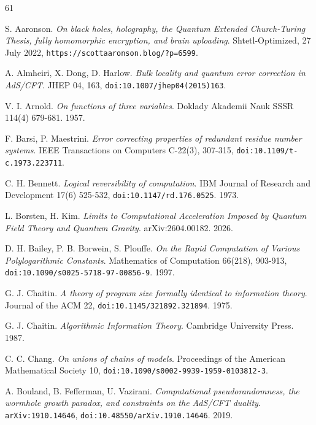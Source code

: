 \backmatter
{}
\begin{thebibliography}{61}

S. Aaronson. \emph{On black holes, holography, the Quantum Extended Church-Turing Thesis, fully homomorphic encryption, and brain uploading}. Shtetl-Optimized, 27 July 2022, \texttt{https:/\allowbreak{}/\allowbreak{}scottaaronson.blog/\allowbreak{}?p=6599}.

A. Almheiri, X. Dong, D. Harlow. \emph{Bulk locality and quantum error correction in AdS/CFT}. JHEP 04, 163, \texttt{doi:10.1007/\allowbreak{}jhep04(2015)163}.

V. I. Arnold. \emph{On functions of three variables}. Doklady Akademii Nauk SSSR 114(4) 679-681. 1957.

F. Barsi, P. Maestrini. \emph{Error correcting properties of redundant residue number systems}. IEEE Transactions on Computers C-22(3), 307-315, \texttt{doi:10.1109/\allowbreak{}t-c.1973.223711}.

C. H. Bennett. \emph{Logical reversibility of computation}. IBM Journal of Research and Development 17(6) 525-532, \texttt{doi:10.1147/\allowbreak{}rd.176.0525}. 1973.

L. Borsten, H. Kim. \emph{Limits to Computational Acceleration Imposed by Quantum Field Theory and Quantum Gravity}. arXiv:2604.00182. 2026.

D. H. Bailey, P. B. Borwein, S. Plouffe. \emph{On the Rapid Computation of Various Polylogarithmic Constants}. Mathematics of Computation 66(218), 903-913, \texttt{doi:10.1090/\allowbreak{}s0025-5718-97-00856-9}. 1997.

G. J. Chaitin. \emph{A theory of program size formally identical to information theory}. Journal of the ACM 22, \texttt{doi:10.1145/\allowbreak{}321892.321894}. 1975.

G. J. Chaitin. \emph{Algorithmic Information Theory}. Cambridge University Press. 1987.

C. C. Chang. \emph{On unions of chains of models}. Proceedings of the American Mathematical Society 10, \texttt{doi:10.1090/\allowbreak{}s0002-9939-1959-0103812-3}.

A. Bouland, B. Fefferman, U. Vazirani. \emph{Computational pseudorandomness, the wormhole growth paradox, and constraints on the AdS/CFT duality}. \texttt{arXiv:1910.14646}, \texttt{doi:10.48550/\allowbreak{}arXiv.1910.14646}. 2019.


\end{thebibliography}
